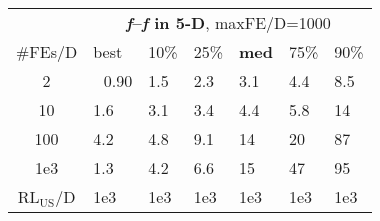 \begin{tabular}{c|llllll}
 & \multicolumn{6}{|c}{\textbf{\textit{f}\raisebox{-0.35ex}{1}--\textit{f}\raisebox{-0.35ex}{24} in 5-D}, maxFE/D=1000}\\
\#FEs/D & best & 10\% & 25\% & \textbf{med} & 75\% & 90\%\\
2 & ~\,0.90 & \hspace*{1ex}1.5 & \hspace*{1ex}2.3 & \hspace*{1ex}3.1 & \hspace*{1ex}4.4 & \hspace*{1ex}8.5\\
10 & \hspace*{1ex}1.6 & \hspace*{1ex}3.1 & \hspace*{1ex}3.4 & \hspace*{1ex}4.4 & \hspace*{1ex}5.8 & 14\\
100 & \hspace*{1ex}4.2 & \hspace*{1ex}4.8 & \hspace*{1ex}9.1 & 14 & 20 & 87\\
1e3 & \hspace*{1ex}1.3 & \hspace*{1ex}4.2 & \hspace*{1ex}6.6 & 15 & 47 & 95\\
$\text{RL}_{\text{US}}$/D & 1e3 & 1e3 & 1e3 & 1e3 & 1e3 & 1e3
\end{tabular}
